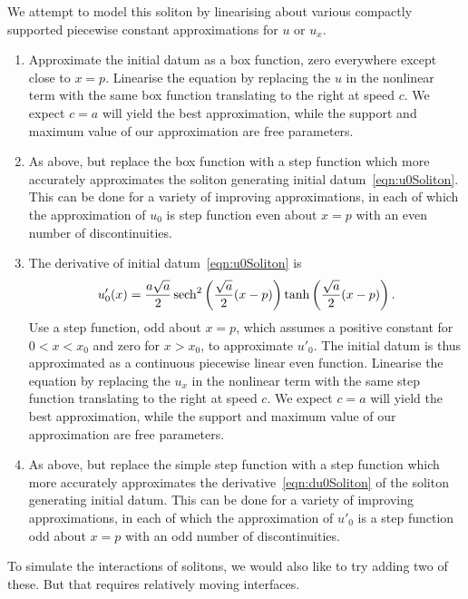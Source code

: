 \documentclass[11pt,reqno,oneside,a4paper]{article}
\begin{document}
We attempt to model this soliton by linearising about various compactly supported piecewise constant approximations for $u$ or $u_x$.
\begin{enumerate}
    \item{
        Approximate the initial datum as a box function, zero everywhere except close to $x=p$.
        Linearise the equation by replacing the $u$ in the nonlinear term with the same box function translating to the right at speed $c$.
        We expect $c=a$ will yield the best approximation, while the support and maximum value of our approximation are free parameters.
    }
    \item{
        As above, but replace the box function with a step function which more accurately approximates the soliton generating initial datum~\eqref{eqn:u0Soliton}.
        This can be done for a variety of improving approximations, in each of which the approximation of $u_0$ is step function even about $x=p$ with an even number of discontinuities.
    }
    \item{
        The derivative of initial datum~\eqref{eqn:u0Soliton} is
        \begin{equation} \label{eqn:du0Soliton}
            u'_0(x) = \frac{a\sqrt{a}}{2}\operatorname{sech}^2\left(\frac{\sqrt{a}}{2}(x-p)\right)\tanh\left(\frac{\sqrt{a}}{2}(x-p)\right).
        \end{equation}
        Use a step function, odd about $x=p$, which assumes a positive constant for $0<x<x_0$ and zero for $x>x_0$, to approximate $u'_0$.
        The initial datum is thus approximated as a continuous piecewise linear even function.
        Linearise the equation by replacing the $u_x$ in the nonlinear term with the same step function translating to the right at speed $c$.
        We expect $c=a$ will yield the best approximation, while the support and maximum value of our approximation are free parameters.
    }
    \item{
        As above, but replace the simple step function with a step function which more accurately approximates the derivative~\eqref{eqn:du0Soliton} of the soliton generating initial datum.
        This can be done for a variety of improving approximations, in each of which the approximation of $u'_0$ is a step function odd about $x=p$ with an odd number of discontinuities.
    }
\end{enumerate}

To simulate the interactions of solitons, we would also like to try adding two of these.
But that requires relatively moving interfaces.
\end{document}

